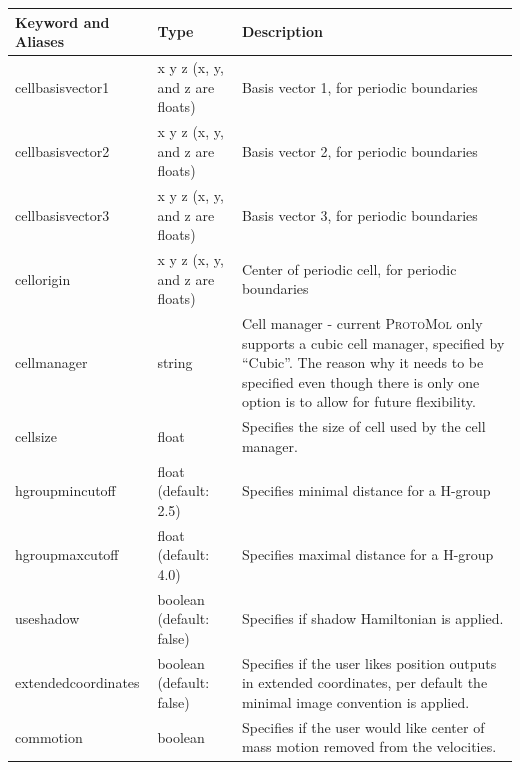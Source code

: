 \documentclass[11pt]{report}
\newcommand{\ProtoMol}{\textsc{ProtoMol }}
\begin{document}
  \begin{tabular}{|p{5.5cm}|p{4cm}|p{6cm}|}\hline
    Keyword and Aliases & Type & Description   \\\hline\hline


    cellbasisvector1 &
    x  y  z  (x, y, and z are floats) &
    Basis vector 1, for periodic boundaries\\\hline


    cellbasisvector2 &
    x  y  z  (x, y, and z are floats) &
    Basis vector 2, for periodic boundaries\\\hline


    cellbasisvector3 &
    x  y  z  (x, y, and z are floats) &
    Basis vector 3, for periodic boundaries\\\hline
    
    
    cellorigin &
    x  y  z  (x, y, and z are floats) &
    Center of periodic cell, for periodic boundaries\\\hline


    cellmanager &
    string &
    Cell manager - current \ProtoMol only supports a cubic cell manager, specified by ``Cubic''.  The reason why it needs to be specified even though there is only one option is to allow for future flexibility. \\\hline

    cellsize &
    float &
    Specifies the size of cell used by the cell manager. \\\hline

    hgroupmincutoff &
    float (default: 2.5)&
    Specifies minimal distance for a H-group \\\hline

    hgroupmaxcutoff &
    float (default: 4.0)&
    Specifies maximal distance for a H-group \\\hline

    useshadow &
    boolean (default: false) &
    Specifies if shadow Hamiltonian is applied.\\\hline

    extendedcoordinates &
    boolean (default: false) &
    Specifies if the user likes position outputs in extended
    coordinates, per default the minimal image convention is applied. \\\hline     

    commotion &
    boolean &
    Specifies if the user would like center of mass motion removed from the velocities. \\\hline\hline




\end{tabular}
\end{document}
